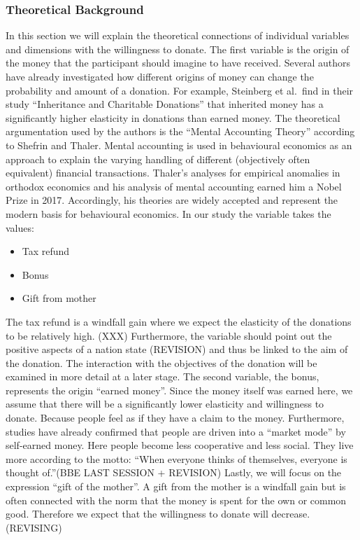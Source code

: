 \documentclass[12pt,]{article}
\providecommand{\tightlist}{%
  \setlength{\itemsep}{0pt}\setlength{\parskip}{0pt}}
\begin{document}
\hypertarget{theoretical-background}{%
\subsubsection{Theoretical Background}\label{theoretical-background}}

In this section we will explain the theoretical connections of
individual variables and dimensions with the willingness to donate. The
first variable is the origin of the money that the participant should
imagine to have received. Several authors have already investigated how
different origins of money can change the probability and amount of a
donation. For example, Steinberg et al.~find in their study
``Inheritance and Charitable Donations'' that inherited money has a
significantly higher elasticity in donations than earned money. The
theoretical argumentation used by the authors is the ``Mental Accounting
Theory'' according to Shefrin and Thaler. Mental accounting is used in
behavioural economics as an approach to explain the varying handling of
different (objectively often equivalent) financial transactions.
Thaler's analyses for empirical anomalies in orthodox economics and his
analysis of mental accounting earned him a Nobel Prize in 2017.
Accordingly, his theories are widely accepted and represent the modern
basis for behavioural economics. In our study the variable takes the
values:

\begin{itemize}
\tightlist
\item
  Tax refund
\item
  Bonus
\item
  Gift from mother
\end{itemize}

The tax refund is a windfall gain where we expect the elasticity of the
donations to be relatively high. (XXX) Furthermore, the variable should
point out the positive aspects of a nation state (REVISION) and thus be
linked to the aim of the donation. The interaction with the objectives
of the donation will be examined in more detail at a later stage. The
second variable, the bonus, represents the origin ``earned money''.
Since the money itself was earned here, we assume that there will be a
significantly lower elasticity and willingness to donate. Because people
feel as if they have a claim to the money. Furthermore, studies have
already confirmed that people are driven into a ``market mode'' by
self-earned money. Here people become less cooperative and less social.
They live more according to the motto: ``When everyone thinks of
themselves, everyone is thought of.''(BBE LAST SESSION + REVISION)
Lastly, we will focus on the expression ``gift of the mother''. A gift
from the mother is a windfall gain but is often connected with the norm
that the money is spent for the own or common good. Therefore we expect
that the willingness to donate will decrease. (REVISING)
\end{document}
